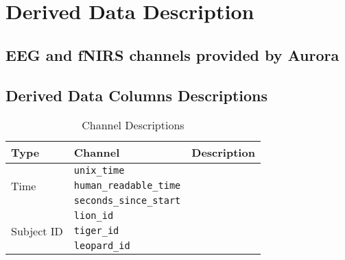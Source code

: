 \section{Derived Data Description}

\subsection{EEG and fNIRS channels provided by Aurora}


\subsection{Derived Data Columns Descriptions}


\begin{table}
\centering
\begin{tabularx}{\textwidth}{|l|l|X|}
\hline
\textbf{Type} & \textbf{Channel} & \textbf{Description} \\
\hline
\multirow{3}{*}{Time} 
& \texttt{unix\_time} & \\
& \texttt{human\_readable\_time} & \\
& \texttt{seconds\_since\_start} & \\
\hline
\multirow{3}{*}{Subject ID} 
& \texttt{lion\_id} & \\
& \texttt{tiger\_id} & \\
& \texttt{leopard\_id} & \\
\hline
\end{tabularx}
\caption{Channel Descriptions}
\label{tab:other_columns}
\end{table}

